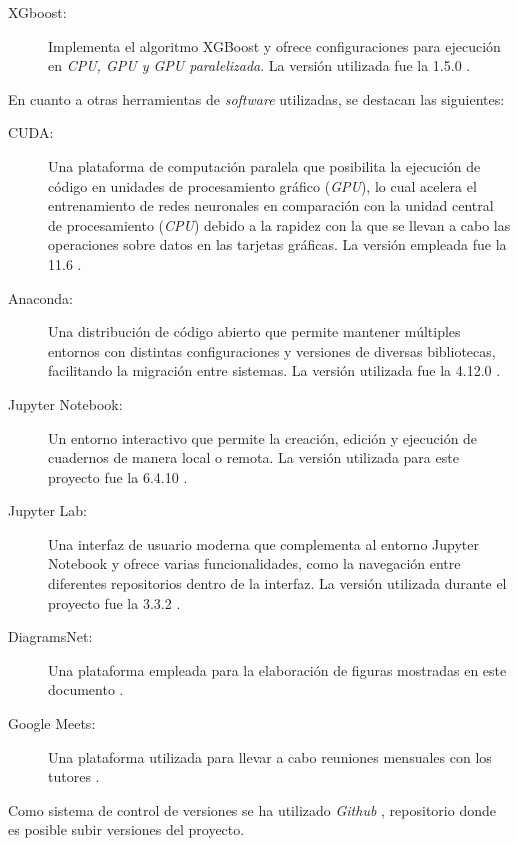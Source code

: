 \documentclass{uathesis-es}
\begin{document}
{\begin{description}
		\item[XGboost:] Implementa el algoritmo XGBoost y ofrece configuraciones para ejecución en \textit{CPU, GPU y GPU paralelizada}. La versión utilizada fue la 1.5.0 \cite{XGBoostLibrary}.
	\end{description}
	
	En cuanto a otras herramientas de \textit{software} utilizadas, se destacan las siguientes:
	
	\begin{description}
		\item[CUDA:] Una plataforma de computación paralela que posibilita la ejecución de código en unidades de procesamiento gráfico (\textit{GPU}), lo cual acelera el entrenamiento de redes neuronales en comparación con la unidad central de procesamiento (\textit{CPU}) debido a la rapidez con la que se llevan a cabo las operaciones sobre datos en las tarjetas gráficas. La versión empleada fue la 11.6 \cite{CUDA}.
		
		\item[Anaconda:] Una distribución de código abierto que permite mantener múltiples entornos con distintas configuraciones y versiones de diversas bibliotecas, facilitando la migración entre sistemas. La versión utilizada fue la 4.12.0 \cite{Anaconda}.
		
		\item[Jupyter Notebook:] Un entorno interactivo que permite la creación, edición y ejecución de cuadernos de manera local o remota. La versión utilizada para este proyecto fue la 6.4.10 \cite{JupyterNotebook}.
		
		\item[Jupyter Lab:] Una interfaz de usuario moderna que complementa al entorno Jupyter Notebook y ofrece varias funcionalidades, como la navegación entre diferentes repositorios dentro de la interfaz. La versión utilizada durante el proyecto fue la 3.3.2 \cite{JupyterLab}.
		
		\item[DiagramsNet:] Una plataforma empleada para la elaboración de figuras mostradas en este documento \cite{DiagramsNet}.
		
		\item[Google Meets:] Una plataforma utilizada para llevar a cabo reuniones mensuales con los tutores \cite{GoogleMeet}.
	\end{description}
	
	
	Como sistema de control de versiones se ha utilizado \textit{Github} \cite{Github}, repositorio donde es posible subir versiones del proyecto.
	
}
\end{document}
